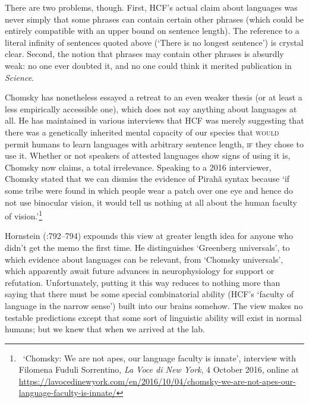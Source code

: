 \documentclass[output=paper,colorlinks,citecolor=brown
]{langscibook}
\begin{document}
There are two problems, though. First, HCF's actual claim about
languages was never simply that some phrases can contain certain other
phrases (which could be entirely compatible with an upper bound on
sentence length). The reference to a literal infinity of sentences
quoted above (`There is no longest sentence') is crystal clear. Second,
the notion that phrases may contain other phrases is absurdly weak:
no one ever doubted it, and no one could think it merited publication
in \textit{Science}.

Chomsky has nonetheless essayed a retreat to an even weaker thesis
(or at least a less empirically accessible one), which does not say
anything about languages at all. He has maintained in various interviews
that HCF was merely suggesting that there was a genetically inherited
mental capacity of our species that \textsc{would} permit humans to
learn languages with arbitrary sentence length, \textsc{if} they chose
to use it. Whether or not speakers of attested languages show signs
of using it is, Chomsky now claims, a total irrelevance. Speaking to
a 2016 interviewer, Chomsky stated that we can dismiss the evidence of
Pirah{\~a} syntax because `if some tribe were found in which people
wear a patch over one eye and hence do not use binocular vision, it
would tell us nothing at all about the human faculty of vision.'\footnote{\,
   `Chomsky: We are not apes, our language faculty is innate', interview
   with Filomena Fuduli Sorrentino, \textit{La Voce di New York},
   4 October 2016, online at
   \url{https://lavocedinewyork.com/en/2016/10/04/chomsky-we-are-not-apes-our-language-faculty-is-innate/}}

Hornstein (\citeyear{Hornstein19}:792--794) expounds this view at
greater length idea for anyone who didn't get the memo the first time.
He distinguishes `Greenberg universals', to which evidence about languages
can be relevant, from `Chomsky universals', which apparently await future
advances in neurophysiology for support or refutation. Unfortunately,
putting it this way reduces to nothing more than saying that there
must be some special combinatorial ability (HCF's `faculty of language
in the narrow sense') built into our brains somehow. The view makes no
testable predictions except that some sort of linguistic ability will
exist in normal humans; but we knew that when we arrived at the lab.
\end{document}
